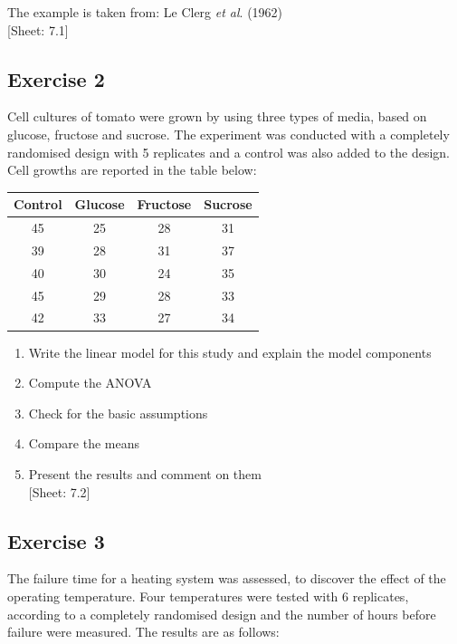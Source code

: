 \documentclass[a4paper,12pt,oneside]{book}
\providecommand{\tightlist}{%
  \setlength{\itemsep}{0pt}\setlength{\parskip}{0pt}}
\begin{document}
The example is taken from: Le Clerg \emph{et al}. (1962)\\
{[}Sheet: 7.1{]}

\hypertarget{exercise-2-5}{%
\subsection{Exercise 2}\label{exercise-2-5}}

Cell cultures of tomato were grown by using three types of media, based on glucose, fructose and sucrose. The experiment was conducted with a completely randomised design with 5 replicates and a control was also added to the design. Cell growths are reported in the table below:

\begin{longtable}[]{@{}cccc@{}}
\toprule
Control & Glucose & Fructose & Sucrose \\
\midrule
\endhead
45 & 25 & 28 & 31 \\
39 & 28 & 31 & 37 \\
40 & 30 & 24 & 35 \\
45 & 29 & 28 & 33 \\
42 & 33 & 27 & 34 \\
\bottomrule
\end{longtable}

\begin{enumerate}
\def\labelenumi{\arabic{enumi}.}
\tightlist
\item
  Write the linear model for this study and explain the model components
\item
  Compute the ANOVA
\item
  Check for the basic assumptions
\item
  Compare the means
\item
  Present the results and comment on them\\
  {[}Sheet: 7.2{]}
\end{enumerate}

\hypertarget{exercise-3-5}{%
\subsection{Exercise 3}\label{exercise-3-5}}

The failure time for a heating system was assessed, to discover the effect of the operating temperature. Four temperatures were tested with 6 replicates, according to a completely randomised design and the number of hours before failure were measured.
The results are as follows:
\end{document}
